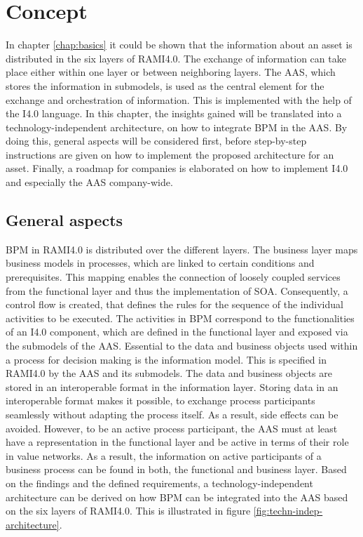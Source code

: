 \chapter{Concept} \label{chap:concept}

In chapter \ref{chap:basics} it could be shown that the information about an asset is distributed in the six layers of \ac{RAMI4.0}. The exchange of information can take place either within one layer or between neighboring layers. The \ac{AAS}, which stores the information in submodels, is used as the central element for the exchange and orchestration of information. This is implemented with the help of the \ac{I4.0} language. In this chapter, the insights gained will be translated into a technology-independent architecture, on how to integrate \ac{BPM} in the \ac{AAS}. By doing this, general aspects will be considered first, before step-by-step instructions are given on how to implement the proposed architecture for an asset. Finally, a roadmap for companies is elaborated on how to implement \ac{I4.0} and especially the \ac{AAS} company-wide.   

\section{General aspects} \label{sec:general-aspects}
 \ac{BPM} in \ac{RAMI4.0} is distributed over the different layers. The business layer maps business models in processes, which are linked to certain conditions and prerequisites. This mapping enables the connection of loosely coupled services from the functional layer and thus the implementation of \ac{SOA}. Consequently, a control flow is created, that defines the rules for the sequence of the individual activities to be executed. The activities in \ac{BPM} correspond to the functionalities of an \ac{I4.0} component, which are defined in the functional layer and exposed via the submodels of the \ac{AAS}. Essential to the data and business objects used within a process for decision making is the information model. This is specified in \ac{RAMI4.0} by the \ac{AAS} and its submodels. The data and business objects are stored in an interoperable format in the information layer. Storing data in an interoperable format makes it possible, to exchange process participants seamlessly without adapting the process itself. As a result, side effects can be avoided. However, to be an active process participant, the \ac{AAS} must at least have a representation in the functional layer and be active in terms of their role in value networks. As a result, the information on active participants of a business process can be found in both, the functional and business layer. Based on the findings and the defined requirements, a technology-independent architecture can be derived on how \ac{BPM} can be integrated into the \ac{AAS} based on the six layers of \ac{RAMI4.0}. This is illustrated in figure \ref{fig:techn-indep-architecture}. 
 
